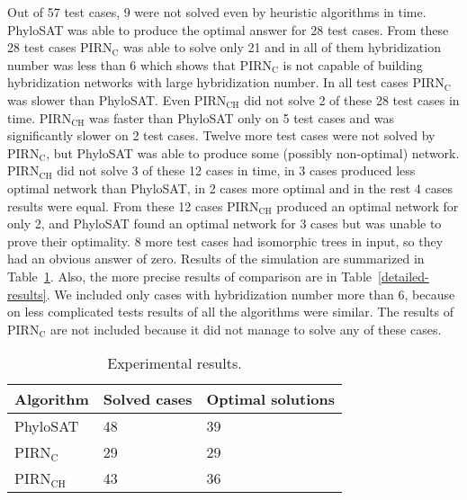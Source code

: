 \documentclass[runningheads, envcountsame, a4paper]{llncs}
\begin{document}
Out of 57 test cases, 9 were not solved even by heuristic algorithms in time. PhyloSAT was able to produce the optimal answer for 28
test cases. From these 28 test cases PIRN$\mathrm{_C}$ was able to solve only 21 and in all of them hybridization number was less than 6
which shows that PIRN$\mathrm{_C}$ is not capable of building hybridization networks with large hybridization number.
In all test cases PIRN$\mathrm{_C}$ was slower than PhyloSAT.
Even PIRN$\mathrm{_{CH}}$ did not solve 2 of these 28 test cases in time. PIRN$\mathrm{_{CH}}$ was faster than PhyloSAT only
on 5 test cases and was significantly slower on 2 test cases. Twelve more test cases were not solved by PIRN$\mathrm{_C}$, but PhyloSAT
was able to produce some (possibly non-optimal) network. PIRN$\mathrm{_{CH}}$ did not solve 3 of these 12 cases in time, in 3 cases 
produced less optimal network than PhyloSAT, in 2 cases more optimal and in the rest 4 cases results were equal. From these 12 cases PIRN$\mathrm{_{CH}}$
produced an optimal network for only 2, and PhyloSAT found an optimal network for 3 cases but was unable to prove their optimality. 
8 more test cases had isomorphic trees in input, so they had an obvious answer of zero.
Results of the simulation are summarized in Table~\ref{exp-results-table}.
Also, the more precise results of comparison are in Table~\ref{detailed-results}. We included only cases with hybridization number more than 6, because on less complicated tests results of all the algorithms were similar.
The results of PIRN$\mathrm{_{C}}$ are not included because it did not manage to solve any of these cases. 

\begin{table}[t]
\centering
\caption{Experimental results.}
\begin{tabular}{l | l | l}
  Algorithm & Solved cases & Optimal solutions \\
  
  \hline
  PhyloSAT & 48 & 39 \\
  PIRN$\mathrm{_C}$ & 29 & 29 \\
  PIRN$\mathrm{_{CH}}$ & 43 & 36 \\
  
\end{tabular}
\label{exp-results-table}
\end{table}
\end{document}
